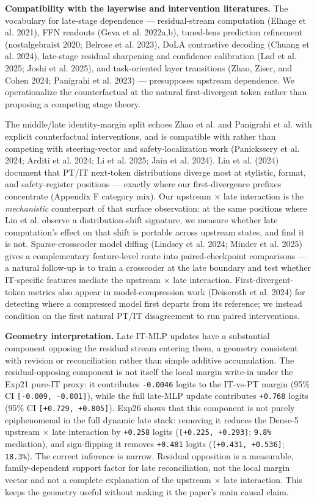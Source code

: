 \documentclass[11pt]{article}
\begin{document}
\textbf{Compatibility with the layerwise and intervention literatures.} The vocabulary for late-stage dependence --- residual-stream computation (Elhage et al. 2021), FFN readouts (Geva et al. 2022a,b), tuned-lens prediction refinement (nostalgebraist 2020; Belrose et al. 2023), DoLA contrastive decoding (Chuang et al. 2024), late-stage residual sharpening and confidence calibration (Lad et al. 2025; Joshi et al. 2025), and task-oriented layer transitions (Zhao, Ziser, and Cohen 2024; Panigrahi et al. 2023) --- presupposes upstream dependence. We operationalize the counterfactual at the natural first-divergent token rather than proposing a competing stage theory.

The middle/late identity-margin split echoes Zhao et al. and Panigrahi et al. with explicit counterfactual interventions, and is compatible with rather than competing with steering-vector and safety-localization work (Panickssery et al. 2024; Arditi et al. 2024; Li et al. 2025; Jain et al. 2024). Lin et al. (2024) document that PT/IT next-token distributions diverge most at stylistic, format, and safety-register positions --- exactly where our first-divergence prefixes concentrate (Appendix F category mix). Our upstream \ensuremath{\times} late interaction is the \emph{mechanistic} counterpart of that surface observation: at the same positions where Lin et al. observe a distribution-shift signature, we measure whether late computation's effect on that shift is portable across upstream states, and find it is not. Sparse-crosscoder model diffing (Lindsey et al. 2024; Minder et al. 2025) gives a complementary feature-level route into paired-checkpoint comparisons --- a natural follow-up is to train a crosscoder at the late boundary and test whether IT-specific features mediate the upstream \ensuremath{\times} late interaction. First-divergent-token metrics also appear in model-compression work (Deiseroth et al. 2024) for detecting where a compressed model first departs from its reference; we instead condition on the first natural PT/IT disagreement to run paired interventions.

\textbf{Geometry interpretation.} Late IT-MLP updates have a substantial component opposing the residual stream entering them, a geometry consistent with revision or reconciliation rather than simple additive accumulation. The residual-opposing component is not itself the local margin write-in under the Exp21 pure-IT proxy: it contributes \texttt{-0.0046} logits to the IT-vs-PT margin (95\% CI \texttt{[-0.009, -0.001]}), while the full late-MLP update contributes \texttt{+0.768} logits (95\% CI \texttt{[+0.729, +0.805]}). Exp26 shows that this component is not purely epiphenomenal in the full dynamic late stack: removing it reduces the Dense-5 upstream \ensuremath{\times} late interaction by \texttt{+0.258} logits (\texttt{[+0.225, +0.293]}; \texttt{9.8\%} mediation), and sign-flipping it removes \texttt{+0.481} logits (\texttt{[+0.431, +0.536]}; \texttt{18.3\%}). The correct inference is narrow. Residual opposition is a measurable, family-dependent support factor for late reconciliation, not the local margin vector and not a complete explanation of the upstream \ensuremath{\times} late interaction. This keeps the geometry useful without making it the paper's main causal claim.
\end{document}
